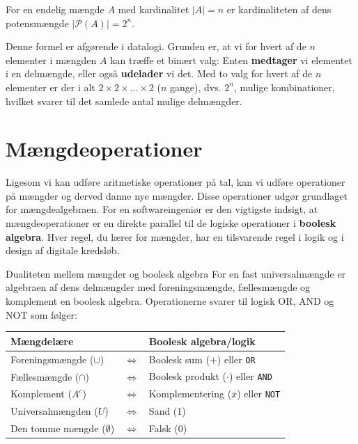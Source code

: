 \begin{remark}
    For en endelig mængde $A$ med kardinalitet $|A| = n$ er kardinaliteten af dens potensmængde $|\mathcal{P}(A)| = 2^n$.
    
    Denne formel er afgørende i datalogi. Grunden er, at vi for hvert af de $n$ elementer i mængden $A$ kan træffe et binært valg: Enten \textbf{medtager} vi elementet i en delmængde, eller også \textbf{udelader} vi det. Med to valg for hvert af de $n$ elementer er der i alt $2 \times 2 \times \dots \times 2$ ($n$ gange), dvs. $2^n$, mulige kombinationer, hvilket svarer til det samlede antal mulige delmængder.
\end{remark}



\section{Mængdeoperationer}
Ligesom vi kan udføre aritmetiske operationer på tal, kan vi udføre operationer på mængder og derved danne nye mængder. Disse operationer udgør grundlaget for mængdealgebraen. For en softwareingeniør er den vigtigste indsigt, at mængdeoperationer er en direkte parallel til de logiske operationer i \textbf{boolesk algebra}. Hver regel, du lærer for mængder, har en tilsvarende regel i logik og i design af digitale kredsløb.

\begin{custombox}{Dualiteten mellem mængder og boolesk algebra}
    For en fast universalmængde er algebraen af dens delmængder med foreningsmængde, fællesmængde og komplement en boolesk algebra. Operationerne svarer til logisk OR, AND og NOT som følger:
    \begin{center}
    \renewcommand{\arraystretch}{1.3}
    \begin{tabular}{lcl}
        \textbf{Mængdelære} & & \textbf{Boolesk algebra/logik} \\
        \hline
        Foreningsmængde ($\cup$) & $\iff$ & Boolesk sum ($+$) eller \texttt{OR} \\
        Fællesmængde ($\cap$) & $\iff$ & Boolesk produkt ($\cdot$) eller \texttt{AND} \\
        Komplement ($A^c$) & $\iff$ & Komplementering ($\overline{x}$) eller \texttt{NOT} \\
        Universalmængden ($U$) & $\iff$ & Sand (1) \\
        Den tomme mængde ($\emptyset$) & $\iff$ & Falsk (0) \\
    \end{tabular}
    \end{center}
\end{custombox}

